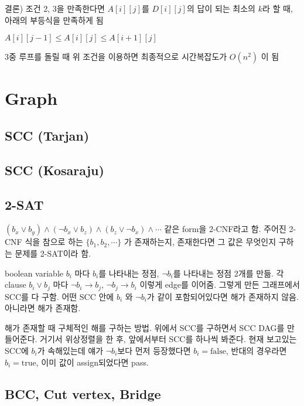 \documentclass[10pt,landscape,a4paper,twocolumn]{article}
\begin{document}
결론) 조건 2, 3을 만족한다면  $A[i][j]$를 $D[i][j]$의 답이 되는 최소의 $k$라 할 때, 아래의 부등식을 만족하게 됨

$A[i][j-1] \leq A[i][j] \leq A[i+1][j]$

3중 루프를 돌릴 때 위 조건을 이용하면 최종적으로 시간복잡도가 $O(n^{2})$ 이 됨

\section{Graph}

\subsection{SCC (Tarjan)}


\subsection{SCC (Kosaraju)}


\subsection{2-SAT}

$(b_{x} \lor b_{y}) \land (\neg b_{x} \lor b_{z}) \land (b_{z} \lor \neg b_{x}) \land \cdots$ 같은 form을 2-CNF라고 함. 주어진 2-CNF 식을 참으로 하는 $\{ b_1, b_2, \cdots \}$ 가 존재하는지, 존재한다면 그 값은 무엇인지 구하는 문제를 2-SAT이라 함.

boolean variable $b_{i}$ 마다 $b_{i}$를 나타내는 정점, $\neg b_{i} $를 나타내는 정점 2개를 만듦. 각 clause $b_{i} \lor b_{j}$ 마다 $\neg b_{i} \to b_{j}$, $\neg b_{j} \to b_{i}$ 이렇게 edge를 이어줌. 그렇게 만든 그래프에서 SCC를 다 구함. 어떤 SCC 안에 $b_{i}$ 와 $\neg b_{i}$가 같이 포함되어있다면 해가 존재하지 않음. 아니라면 해가 존재함.

해가 존재할 때 구체적인 해를 구하는 방법. 위에서 SCC를 구하면서 SCC DAG를 만들어준다. 거기서 위상정렬을 한 후, 앞에서부터 SCC를 하나씩 봐준다. 현재 보고있는 SCC에 $b_{i}$가 속해있는데 얘가 $\neg b_{i}$보다 먼저 등장했다면 $b_{i} = \mathrm{false}$, 반대의 경우라면 $b_{i} = \mathrm{true}$, 이미 값이 assign되었다면 pass.

\subsection{BCC, Cut vertex, Bridge}

\end{document}
